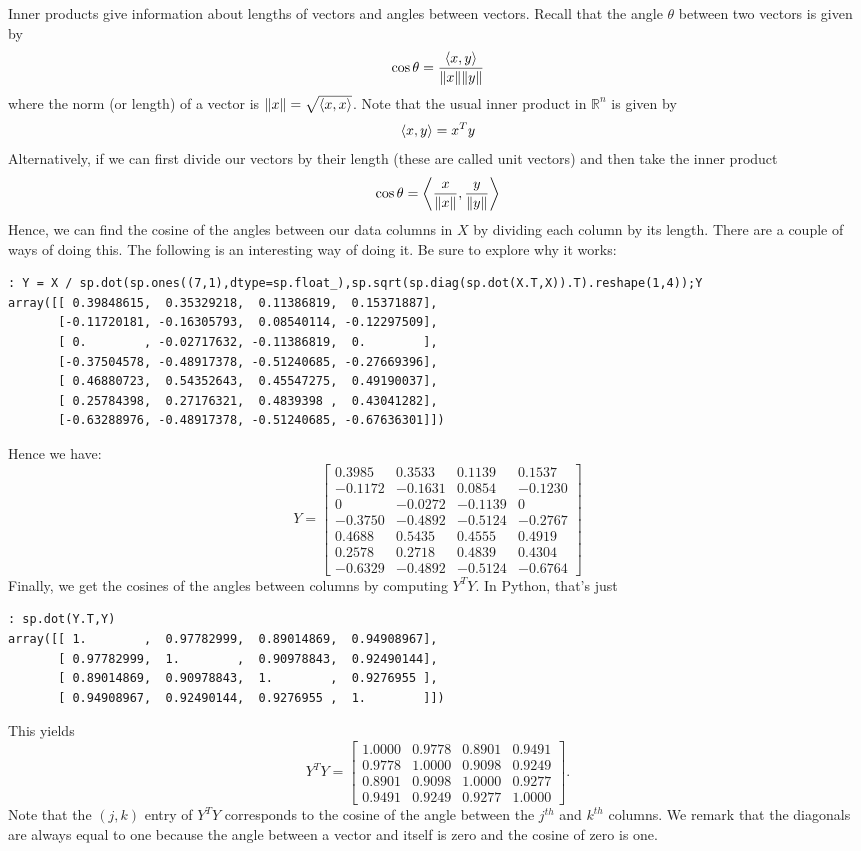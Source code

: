 Inner products give information about lengths of vectors and angles between vectors.  Recall that the angle $\theta$ between two vectors is given by
\[
\cos{\theta} = \frac{\langle x,y \rangle}{\lVert x\rVert\lVert y\rVert}
\]
where the norm (or length) of a vector is $\lVert x\rVert = \sqrt{\langle x,x \rangle}$.  Note that the usual inner product in $\mathbb{R}^n$ is given by
\[
\langle x,y \rangle = x^T y
\]
Alternatively, if we can first divide our vectors by their length (these are called unit vectors) and then take the inner product
\[
\cos{\theta} = \left\langle\frac{x}{\lVert x\rVert},\frac{y}{\lVert y\rVert}\right\rangle
\]
Hence, we can find the cosine of the angles between our data columns in $X$ by dividing each column by its length.  There are a couple of ways of doing this.  The following is an interesting way of doing it.  Be sure to explore why it works:
\begin{lstlisting}[style=python]
: Y = X / sp.dot(sp.ones((7,1),dtype=sp.float_),sp.sqrt(sp.diag(sp.dot(X.T,X)).T).reshape(1,4));Y
array([[ 0.39848615,  0.35329218,  0.11386819,  0.15371887],
       [-0.11720181, -0.16305793,  0.08540114, -0.12297509],
       [ 0.        , -0.02717632, -0.11386819,  0.        ],
       [-0.37504578, -0.48917378, -0.51240685, -0.27669396],
       [ 0.46880723,  0.54352643,  0.45547275,  0.49190037],
       [ 0.25784398,  0.27176321,  0.4839398 ,  0.43041282],
       [-0.63288976, -0.48917378, -0.51240685, -0.67636301]])
\end{lstlisting}
Hence we have:
\[
Y=
\begin{bmatrix}
0.3985 & 0.3533 & 0.1139 & 0.1537\\
-0.1172 & -0.1631 & 0.0854 & -0.1230\\
0 &-0.0272 &-0.1139 & 0\\
-0.3750 & -0.4892 & -0.5124 & -0.2767\\
0.4688 & 0.5435 & 0.4555 & 0.4919\\
0.2578 & 0.2718 & 0.4839 & 0.4304\\
-0.6329 & -0.4892 & -0.5124 & -0.6764
\end{bmatrix}
\]
Finally, we get the cosines of the angles between columns by computing $Y^T Y$.  In Python, that's just
\begin{lstlisting}[style=python]
: sp.dot(Y.T,Y)
array([[ 1.        ,  0.97782999,  0.89014869,  0.94908967],
       [ 0.97782999,  1.        ,  0.90978843,  0.92490144],
       [ 0.89014869,  0.90978843,  1.        ,  0.9276955 ],
       [ 0.94908967,  0.92490144,  0.9276955 ,  1.        ]])
\end{lstlisting}
This yields
\[
Y^T Y = 
\begin{bmatrix}
1.0000 & 0.9778 & 0.8901 & 0.9491\\
0.9778 & 1.0000 & 0.9098 & 0.9249\\
0.8901 & 0.9098 & 1.0000 & 0.9277\\
0.9491 & 0.9249 & 0.9277 & 1.0000
\end{bmatrix}.
\]
Note that the $(j,k)$ entry of $Y^T Y$ corresponds to the cosine of the angle between the $j^{th}$ and $k^{th}$ columns.  We remark that the diagonals are always equal to one because the angle between a vector and itself is zero and the cosine of zero is one.

